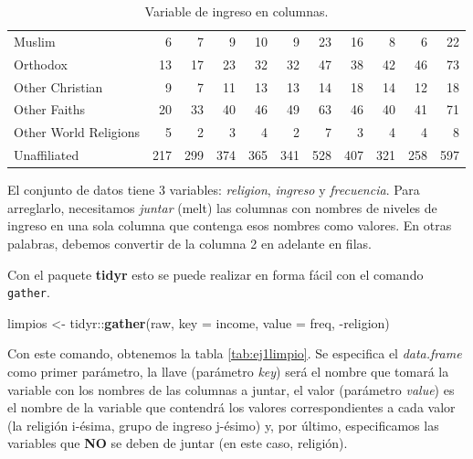 \documentclass[]{article}
\newenvironment{Shaded}{\begin{snugshade}}{\end{snugshade}}
\newcommand{\KeywordTok}[1]{\textcolor[rgb]{0.13,0.29,0.53}{\textbf{{#1}}}}
\newcommand{\DataTypeTok}[1]{\textcolor[rgb]{0.13,0.29,0.53}{{#1}}}
\newcommand{\StringTok}[1]{\textcolor[rgb]{0.31,0.60,0.02}{{#1}}}
\newcommand{\NormalTok}[1]{{#1}}
\begin{document}
\begin{table}[ht]
{\begin{tabular}{lrrrrrrrrrr}
  Muslim &   6 &   7 &   9 &  10 &   9 &  23 &  16 &   8 &   6 &  22 \\ 
  Orthodox &  13 &  17 &  23 &  32 &  32 &  47 &  38 &  42 &  46 &  73 \\ 
  Other Christian &   9 &   7 &  11 &  13 &  13 &  14 &  18 &  14 &  12 &  18 \\ 
  Other Faiths &  20 &  33 &  40 &  46 &  49 &  63 &  46 &  40 &  41 &  71 \\ 
  Other World Religions &   5 &   2 &   3 &   4 &   2 &   7 &   3 &   4 &   4 &   8 \\ 
  Unaffiliated & 217 & 299 & 374 & 365 & 341 & 528 & 407 & 321 & 258 & 597 \\ 
   \hline
\end{tabular}
}
\caption{Variable de ingreso en columnas.} 
\label{tab:varsencols}
\end{table}

El conjunto de datos tiene 3 variables: \emph{religion}, \emph{ingreso}
y \emph{frecuencia}. Para arreglarlo, necesitamos \emph{juntar} (melt)
las columnas con nombres de niveles de ingreso en una sola columna que
contenga esos nombres como valores. En otras palabras, debemos convertir
de la columna 2 en adelante en filas.

Con el paquete \textbf{tidyr} esto se puede realizar en forma fácil con
el comando \texttt{gather}.

\begin{Shaded}
\begin{Highlighting}[]
\NormalTok{limpios <-}\StringTok{ }\NormalTok{tidyr::}\KeywordTok{gather}\NormalTok{(raw, }\DataTypeTok{key =} \NormalTok{income, }\DataTypeTok{value =} \NormalTok{freq, -religion)}
\end{Highlighting}
\end{Shaded}

Con este comando, obtenemos la tabla \ref{tab:ej1limpio}. Se especifica
el \emph{data.frame} como primer parámetro, la llave (parámetro
\emph{key}) será el nombre que tomará la variable con los nombres de las
columnas a juntar, el valor (parámetro \emph{value}) es el nombre de la
variable que contendrá los valores correspondientes a cada valor (la
religión i-ésima, grupo de ingreso j-ésimo) y, por último, especificamos
las variables que \textbf{NO} se deben de juntar (en este caso,
religión).
\end{document}

